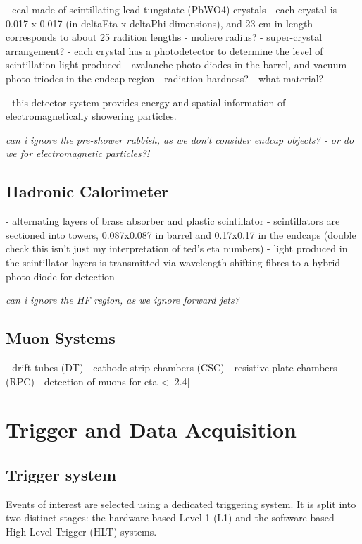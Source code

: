 - ecal made of scintillating lead tungstate (PbWO4) crystals
    - each crystal is 0.017 x 0.017 (in deltaEta x deltaPhi dimensions), and 23 
    cm in length
        -   corresponds to about 25 radition lengths
        - moliere radius?
    - super-crystal arrangement?
- each crystal has a photodetector to determine the level of scintillation light
produced
    - avalanche photo-diodes in the barrel, and vacuum photo-triodes in the 
    endcap region
    - radiation hardness?
    - what material?

- this detector system provides energy and spatial information of
electromagnetically showering particles.

\emph{can i ignore the pre-shower rubbish, as we don't consider endcap objects? 
- or do we for electromagnetic particles?!}

\subsection{Hadronic Calorimeter}

- alternating layers of brass absorber and plastic scintillator
- scintillators are sectioned into towers, 0.087x0.087 in barrel and 0.17x0.17 
in the endcaps (double check this isn't just my interpretation of ted's eta 
numbers)
- light produced in the scintillator layers is transmitted via wavelength 
shifting fibres to a hybrid photo-diode for detection

\emph{can i ignore the HF region, as we ignore forward jets?}

\subsection{Muon Systems}

- drift tubes (DT)
- cathode strip chambers (CSC)
- resistive plate chambers (RPC)
- detection of muons for eta < |2.4|

\section{Trigger and Data Acquisition}  %
\label{sec:detector_daq}

\subsection{Trigger system}
Events of interest are selected using a dedicated triggering system. It is 
split into two distinct stages: the hardware-based Level 1 (L1) and
the software-based High-Level Trigger (HLT) systems.

